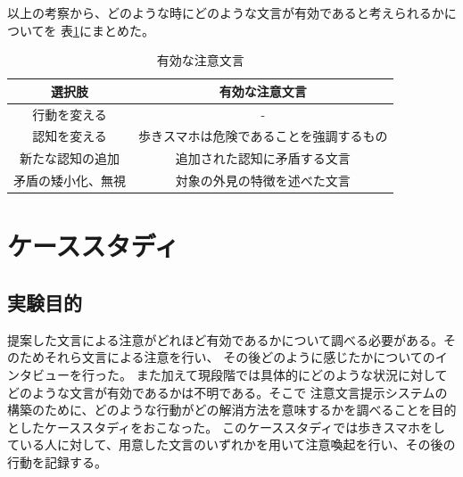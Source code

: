 \documentclass{kuisthesis}
\begin{document}
\vspace{5mm}
以上の考察から、どのような時にどのような文言が有効であると考えられるかについてを
表\ref{fig: EffectiveWords}にまとめた。
\begin{table}[H]
  \centering
  \caption{有効な注意文言}
  \label{fig: EffectiveWords}
  \begin{tabular}{c|c|c|c}
      \multicolumn{2}{c|}{選択肢} & \multicolumn{2}{c}{有効な注意文言} \\ \hline
      \multicolumn{2}{c|}{行動を変える} & \multicolumn{2}{c}{-} \\ \hline
      \multicolumn{2}{c|}{認知を変える} & \multicolumn{2}{c}{歩きスマホは危険であることを強調するもの} \\ \hline
      \multicolumn{2}{c|}{新たな認知の追加} & \multicolumn{2}{c}{追加された認知に矛盾する文言} \\ \hline
      \multicolumn{2}{c|}{矛盾の矮小化、無視} & \multicolumn{2}{c}{対象の外見の特徴を述べた文言} \\
  \end{tabular}
\end{table}
\section{ケーススタディ}
\subsection{実験目的}
提案した文言による注意がどれほど有効であるかについて調べる必要がある。そのためそれら文言による注意を行い、
その後どのように感じたかについてのインタビューを行った。
また加えて現段階では具体的にどのような状況に対してどのような文言が有効であるかは不明である。そこで
注意文言提示システムの構築のために、どのような行動がどの解消方法を意味するかを調べることを目的としたケーススタディをおこなった。
このケーススタディでは歩きスマホをしている人に対して、用意した文言のいずれかを用いて注意喚起を行い、その後の行動を記録する。
\end{document}
